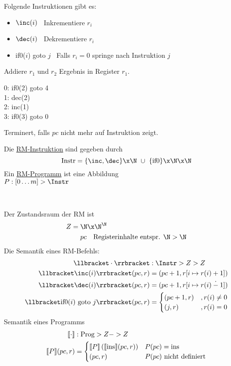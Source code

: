 Folgende Instruktionen gibt es:
\begin{itemize}
	\item $\inc(i)$ \ Inkrementiere $r_i$
	\item $\dec(i)$ \ Dekrementiere $r_i$
	\item if0($i$) goto $j$ \ Falls $r_i=0$ springe nach Instruktion $j$
\end{itemize}
\begin{Bsp}
	Addiere $r_1$ und $r_2$ Ergebnis in Register $r_1$.
	
	0: if0(2) goto 4\\
	1: dec(2)\\
	2: inc(1)\\
	3: if0(3) goto 0
	
	Terminert, falls $pc$ nicht mehr auf Instruktion zeigt.
\end{Bsp}
\begin{Def}[\acf{RM}]
	Die \underline{\ac{RM}-Instruktion} sind gegeben durch
	\[ \text{Instr} = \{\inc, \dec\}\x\N\ \cup\ \{\text{if0}\}\x\N\x\N \]
	Ein \underline{\ac{RM}-Programm} ist eine Abbildung\\
	$P:[0\dots m]\->\Instr$
\end{Def}
\begin{Def}\
	
	Der Zustandsraum der \ac{RM} ist
	\begin{align*}
		Z ={} &\N\x\N^\N\\
		&pc \quad \text{Registerinhalte entspr. }\N\->\N
	\end{align*}
	Die Semantik eines \ac{RM}-Befehls:
	\begin{align*}
		\llbracket\cdot\rrbracket &: \Instr \-> Z\-> Z\\
		\llbracket\inc(i)\rrbracket(pc,r) &= (pc+1,r[i\mapsto r(i)+1])\\
		\llbracket\dec(i)\rrbracket(pc,r) &= (pc+1,r[i\mapsto r(i)\overset{\text{\normalsize .}}-1])\\
		\llbracket\text{if0($i$) goto }j\rrbracket(pc,r) &= 
		\begin{cases}
			(pc+1, r) &, r(i)\neq 0\\
			(j,r) &, r(i)=0
		\end{cases}
	\end{align*}
	Semantik eines Programms
	\begin{align*}
		\llbracket\cdot\rrbracket &: \text{Prog} \-> Z- \-> Z\\
		\llbracket P \rrbracket(pc,r) &=
		\begin{cases}
			\llbracket P \rrbracket \left(\llbracket \text{ins} \rrbracket(pc,r)\right) &P(pc)=\text{ins}\\
			(pc,r) &P(pc)\text{ nicht definiert}
		\end{cases}
	\end{align*}
\end{Def}
